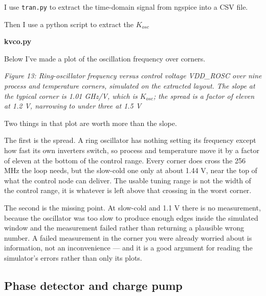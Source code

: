 I use \texttt{tran.py} to extract the time-domain signal from ngspice
into a CSV file.

Then I use a python script to extract the \(K_{osc}\)

\textbf{kvco.py}

\begin{Shaded}
\begin{Highlighting}[]
\OperatorTok{=}
\OperatorTok{=} \OperatorTok{/}\NormalTok{df[}\NormalTok{]}
\OperatorTok{=}\OperatorTok{/}\NormalTok{df[}\NormalTok{].diff())}
\end{Highlighting}
\end{Shaded}

Below I've made a plot of the oscillation frequency over corners.


{
\centering
{}
}

\emph{Figure 13: Ring-oscillator frequency versus control voltage
VDD\_ROSC over nine process and temperature corners, simulated on the
extracted layout. The slope at the typical corner is 1.01 GHz/V, which
is \(K_{osc}\); the spread is a factor of eleven at 1.2 V, narrowing to
under three at 1.5 V}

Two things in that plot are worth more than the slope.

The first is the spread. A ring oscillator has nothing setting its
frequency except how fast its own inverters switch, so process and
temperature move it by a factor of eleven at the bottom of the control
range. Every corner does cross the 256 MHz the loop needs, but the
slow-cold one only at about 1.44 V, near the top of what the control
node can deliver. The usable tuning range is not the width of the
control range, it is whatever is left above that crossing in the worst
corner.

The second is the missing point. At slow-cold and 1.1 V there is no
measurement, because the oscillator was too slow to produce enough edges
inside the simulated window and the measurement failed rather than
returning a plausible wrong number. A failed measurement in the corner
you were already worried about is information, not an inconvenience ---
and it is a good argument for reading the simulator's errors rather than
only its plots.

\subsection{Phase detector and charge
pump}\label{phase-detector-and-charge-pump}


